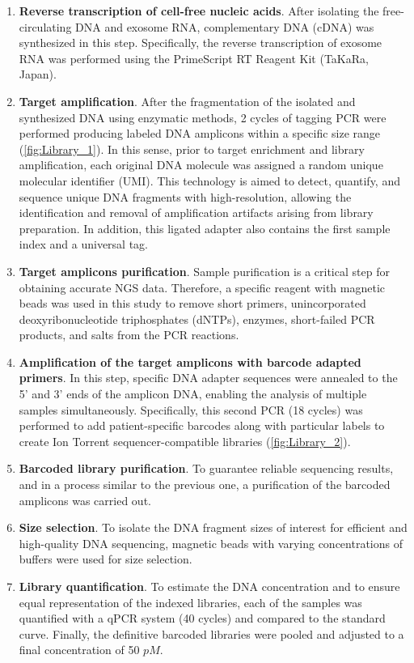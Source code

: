 \begin{enumerate}[font=\bfseries]
    \item \textbf{Reverse transcription of cell-free nucleic acids}. After isolating the free-circulating DNA and exosome RNA, complementary DNA (cDNA) was synthesized in this step. Specifically, the reverse transcription of exosome RNA was performed using the PrimeScript\texttrademark{} RT Reagent Kit (TaKaRa, Japan).
    \item \textbf{Target amplification}. After the fragmentation of the isolated and synthesized DNA using enzymatic methods, 2 cycles of tagging PCR were performed producing labeled DNA amplicons within a specific size range (\autoref{fig:Library_1}). In this sense, prior to target enrichment and library amplification, each original DNA molecule was assigned a random unique molecular identifier (UMI). This technology is aimed to detect, quantify, and sequence unique DNA fragments with high-resolution, allowing the identification and removal of amplification artifacts arising from library preparation. In addition, this ligated adapter also contains the first sample index and a universal tag.
    \item \textbf{Target amplicons purification}. Sample purification is a critical step for obtaining accurate NGS data. Therefore, a specific reagent with magnetic beads was used in this study to remove short primers, unincorporated deoxyribonucleotide triphosphates (dNTPs), enzymes, short-failed PCR products, and salts from the PCR reactions.
    \item \textbf{Amplification of the target amplicons with barcode adapted primers}. In this step, specific DNA adapter sequences were annealed to the 5' and 3' ends of the amplicon DNA, enabling the analysis of multiple samples simultaneously. Specifically, this second PCR (18 cycles) was performed to add patient-specific barcodes along with particular labels to create Ion Torrent\texttrademark{} sequencer-compatible libraries (\autoref{fig:Library_2}).
    \item \textbf{Barcoded library purification}. To guarantee reliable sequencing results, and in a process similar to the previous one, a purification of the barcoded amplicons was carried out.
    \item \textbf{Size selection}. To isolate the DNA fragment sizes of interest for efficient and high-quality DNA sequencing, magnetic beads with varying concentrations of buffers were used for size selection.
    \item \textbf{Library quantification}. To estimate the DNA concentration and to ensure equal representation of the indexed libraries, each of the samples was quantified with a qPCR system (40 cycles) and compared to the standard curve. Finally, the definitive barcoded libraries were pooled and adjusted to a final concentration of 50 $pM$.
\end{enumerate}

